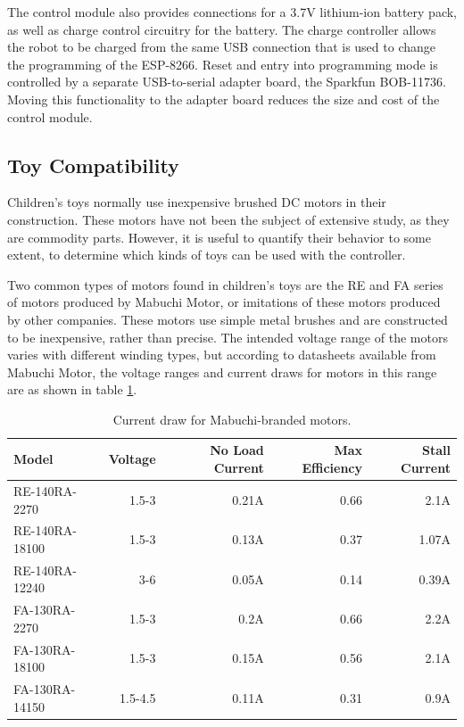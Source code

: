 The control module also provides connections for a 3.7V lithium-ion battery pack, as well as charge control circuitry for the battery. 
The charge controller allows the robot to be charged from the same USB connection that is used to change the programming of the ESP-8266. 
Reset and entry into programming mode is controlled by a separate USB-to-serial adapter board, the Sparkfun BOB-11736.
Moving this functionality to the adapter board reduces the size and cost of the control module. 

\subsection{Toy Compatibility} \label{section:Toy_Compatibility}

Children's toys normally use inexpensive brushed DC motors in their construction. 
These motors have not been the subject of extensive study, as they are commodity parts. 
However, it is useful to quantify their behavior to some extent, to determine which kinds of toys can be used with the controller. 

Two common types of motors found in children's toys are the RE and FA series of motors produced by Mabuchi Motor, or imitations of these motors produced by other companies. 
These motors use simple metal brushes and are constructed to be inexpensive, rather than precise. 
The intended voltage range of the motors varies with different winding types, but according to datasheets available from Mabuchi Motor, the voltage ranges and current draws for motors in this range are as shown in table \ref{tab:properBrandedMotors}.

\begin{table}
	\begin{tabular}{l r r r r}
		Model & Voltage & No Load Current & Max Efficiency & Stall Current\\
		\hline
		RE-140RA-2270 & 1.5-3 & 0.21A & 0.66 & 2.1A\\
		RE-140RA-18100 & 1.5-3 & 0.13A & 0.37 & 1.07A\\
		RE-140RA-12240 & 3-6 & 0.05A & 0.14 & 0.39A\\
		FA-130RA-2270 & 1.5-3 & 0.2A & 0.66 & 2.2A\\
		FA-130RA-18100 & 1.5-3 & 0.15A & 0.56 & 2.1A\\
		FA-130RA-14150 & 1.5-4.5 & 0.11A & 0.31 & 0.9A\\
	\end{tabular}
	\caption{Current draw for Mabuchi-branded motors.}
	\label{tab:properBrandedMotors}
\end{table}

